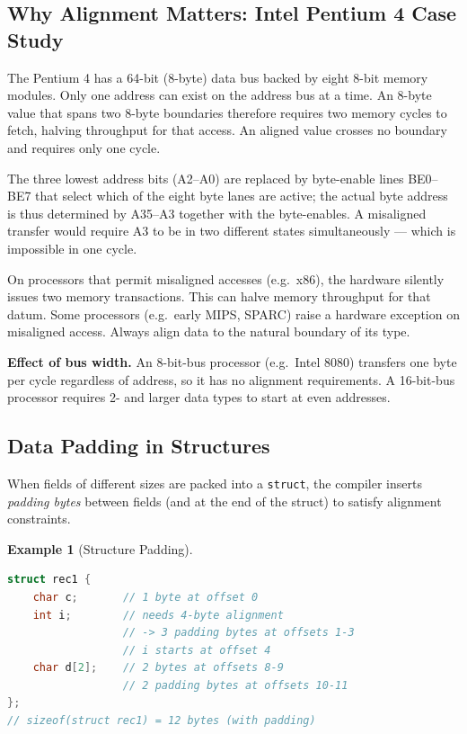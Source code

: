 \documentclass[11pt, a4paper, notitlepage]{report}
\theoremstyle{definition}
\theoremstyle{remark}
\theoremstyle{definition}
\newtheorem{example}[theorem]{Example}
\begin{document}
\subsection{Why Alignment Matters: Intel Pentium 4 Case Study}

The Pentium 4 has a 64-bit (8-byte) data bus backed by eight 8-bit memory modules. Only one address can exist on the address bus at a time. An 8-byte value that spans two 8-byte boundaries therefore requires two memory cycles to fetch, halving throughput for that access. An aligned value crosses no boundary and requires only one cycle.

The three lowest address bits (A2--A0) are replaced by byte-enable lines BE0--BE7 that select which of the eight byte lanes are active; the actual byte address is thus determined by A35--A3 together with the byte-enables. A misaligned transfer would require A3 to be in two different states simultaneously --- which is impossible in one cycle.

\begin{warning}[title={Misaligned Access is Slow}]
On processors that permit misaligned accesses (e.g.\ x86), the hardware silently issues two memory transactions. This can halve memory throughput for that datum. Some processors (e.g.\ early MIPS, SPARC) raise a hardware exception on misaligned access. Always align data to the natural boundary of its type.
\end{warning}

\textbf{Effect of bus width.} An 8-bit-bus processor (e.g.\ Intel 8080) transfers one byte per cycle regardless of address, so it has no alignment requirements. A 16-bit-bus processor requires 2- and larger data types to start at even addresses.

\subsection{Data Padding in Structures}

When fields of different sizes are packed into a \texttt{struct}, the compiler inserts \emph{padding bytes} between fields (and at the end of the struct) to satisfy alignment constraints.

\begin{example}[Structure Padding]
\leavevmode
\begin{lstlisting}[language=C]
struct rec1 {
    char c;       // 1 byte at offset 0
    int i;        // needs 4-byte alignment
                  // -> 3 padding bytes at offsets 1-3
                  // i starts at offset 4
    char d[2];    // 2 bytes at offsets 8-9
                  // 2 padding bytes at offsets 10-11
};
// sizeof(struct rec1) = 12 bytes (with padding)
\end{lstlisting}
\end{example}
\end{document}
